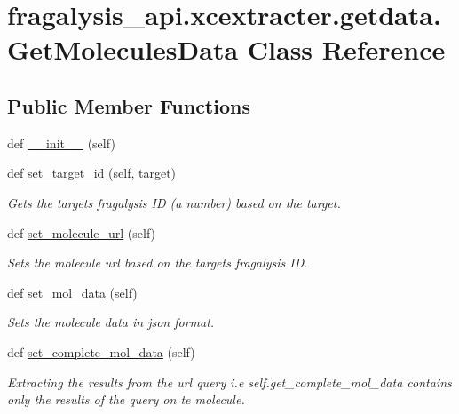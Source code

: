 \hypertarget{classfragalysis__api_1_1xcextracter_1_1getdata_1_1_get_molecules_data}{}\section{fragalysis\+\_\+api.\+xcextracter.\+getdata.\+Get\+Molecules\+Data Class Reference}
\label{classfragalysis__api_1_1xcextracter_1_1getdata_1_1_get_molecules_data}
\subsection*{Public Member Functions}
\begin{DoxyCompactItemize}
\item 
def \hyperlink{classfragalysis__api_1_1xcextracter_1_1getdata_1_1_get_molecules_data_a11e4a33bfbb0ff558ef33a0e8a46c76b}{\+\_\+\+\_\+init\+\_\+\+\_\+} (self)
\item 
def \hyperlink{classfragalysis__api_1_1xcextracter_1_1getdata_1_1_get_molecules_data_acc782fb40405a434903f6d3e80624c9c}{set\+\_\+target\+\_\+id} (self, target)
\begin{DoxyCompactList}\small\item\em Gets the targets fragalysis ID (a number) based on the target. \end{DoxyCompactList}\item 
def \hyperlink{classfragalysis__api_1_1xcextracter_1_1getdata_1_1_get_molecules_data_a61f7510bc705fab0ee33128872619f40}{set\+\_\+molecule\+\_\+url} (self)
\begin{DoxyCompactList}\small\item\em Sets the molecule url based on the targets fragalysis ID. \end{DoxyCompactList}\item 
def \hyperlink{classfragalysis__api_1_1xcextracter_1_1getdata_1_1_get_molecules_data_ab1f0b5b8edbd496d800e08c7f8758a53}{set\+\_\+mol\+\_\+data} (self)
\begin{DoxyCompactList}\small\item\em Sets the molecule data in json format. \end{DoxyCompactList}\item 
def \hyperlink{classfragalysis__api_1_1xcextracter_1_1getdata_1_1_get_molecules_data_a5bf2f4562196e169f76aa30cdcd9029d}{set\+\_\+complete\+\_\+mol\+\_\+data} (self)
\begin{DoxyCompactList}\small\item\em Extracting the results from the url query i.\+e self.\+get\+\_\+complete\+\_\+mol\+\_\+data contains only the results of the query on te molecule. \end{DoxyCompactList}\end{DoxyCompactItemize}
